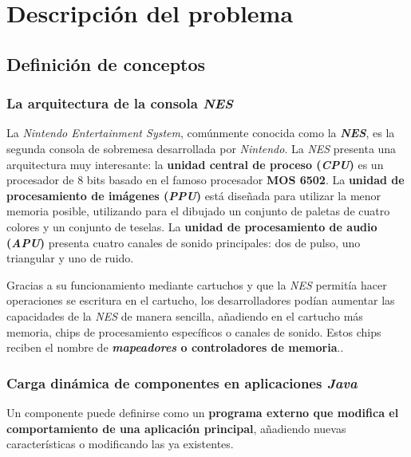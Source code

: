 \chapter{Descripción del problema} \label{ch:descripcion-del-problema}


\section{Definición de conceptos}\label{sec:definicion-de-conceptos}

\subsection{La arquitectura de la consola \textit{NES}}\label{subsec:la-arquitectura-mips}

La \textit{Nintendo Entertainment System}, comúnmente conocida como
la \textbf{\textit{NES}}, es la segunda consola de sobremesa desarrollada por
\textit{Nintendo}.
La \textit{NES} presenta una arquitectura muy interesante:
la \textbf{unidad central de proceso (\textit{CPU})} es un procesador
de 8 bits basado en el famoso procesador \textbf{MOS 6502}\cite{MOS6502}.
La \textbf{unidad de procesamiento de imágenes (\textit{PPU})} está
diseñada para utilizar la menor memoria posible, utilizando para
el dibujado un conjunto de paletas de cuatro colores y un conjunto
de teselas.
La \textbf{unidad de procesamiento de audio (\textit{APU})} presenta
cuatro canales de sonido principales: dos de pulso, uno triangular
y uno de ruido.

 Gracias a su funcionamiento mediante cartuchos y que la
\textit{NES} permitía hacer operaciones se escritura en el cartucho,
los desarrolladores podían aumentar las capacidades de la \textit{NES} de manera sencilla,
añadiendo en el cartucho más memoria, chips de procesamiento específicos
o canales de sonido.
Estos chips reciben el nombre de \textbf{\textit{mapeadores}
o controladores de memoria}.\cite{MAPPERS}.

\subsection{Carga dinámica de componentes en aplicaciones \textit{Java}}
\label{subsec:carga-dinamica-de-componentes-en-aplicaciones-java}

Un componente puede definirse como un \textbf{programa externo que modifica
el comportamiento de una aplicación principal}, añadiendo nuevas
características o modificando las ya existentes.

